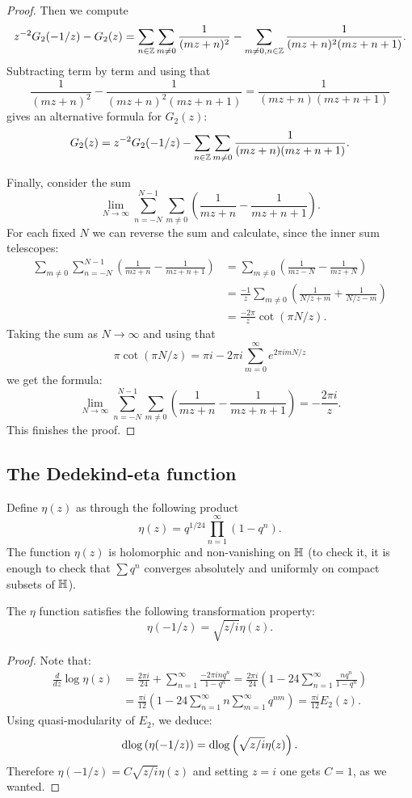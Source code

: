 \begin{proof}
Then we compute
\[
z^{-2}G_2(-1/z)-G_2(z) = \sum_{n\in\mathbb{Z}}\sum_{m\neq 0}\frac{1}{(mz+n)^2} - \sum_{m\neq 0,n\in\mathbb{Z}} \frac{1}{(mz+n)^2(mz+n+1)}.
\]
Subtracting term by term and using that
\[
\frac{1}{(mz+n)^2} - \frac{1}{(mz+n)^2(mz+n+1)} = \frac{1}{(mz+n)(mz+n+1)}
\]
gives an alternative formula for $G_2(z)$:
\[
G_2(z) = z^{-2}G_2(-1/z) - \sum_{n\in\mathbb{Z}}\sum_{m\neq 0} \frac{1}{(mz+n)(mz+n+1)}.
\]

Finally, consider the sum
\[
\lim_{N\to\infty} \sum_{n=-N}^{N-1}\sum_{m\neq 0}\left(\frac{1}{mz+n}-\frac{1}{mz+n+1}\right).
\]
For each fixed $N$ we can reverse the sum and calculate, since the inner sum telescopes:
\begin{align*}
\sum_{m\neq 0}\sum_{n=-N}^{N-1} \left(\frac{1}{mz+n}-\frac{1}{mz+n+1}\right) &= \sum_{m\neq 0} \left(\frac{1}{mz-N} - \frac{1}{mz+N}\right)\\
&=\frac{-1}{z}\sum_{m\neq 0}\left( \frac{1}{N/z + m}+\frac{1}{N/z-m}\right)\\
&=\frac{-2\pi}{z}\cot(\pi N/z).
\end{align*}
Taking the sum as $N\to \infty$ and using that
\[
\pi\cot(\pi N/z)=\pi i-2\pi i\sum_{m=0}^\infty e^{2\pi i mN/z}
\]
we get the formula:
\[
\lim_{N\to\infty} \sum_{n=-N}^{N-1}\sum_{m\neq 0}\left(\frac{1}{mz+n}-\frac{1}{mz+n+1}\right)=-\frac{2\pi i}{z}.
\]
This finishes the proof.
\end{proof}

\subsection{The Dedekind-eta function}
\label{sec:dedekind-eta}

Define $\eta(z)$ as through the following product
\[
\eta(z) = q^{1/24}\prod_{n=1}^\infty (1-q^n).
\]
The function $\eta(z)$ is holomorphic and non-vanishing on $\mathbb{H}$ (to check it, it is enough to check that $\sum q^n$ converges absolutely and uniformly on compact subsets of $\mathbb{H}$).
\begin{theorem}
The $\eta$ function satisfies the following transformation property:
  \[
\eta(-1/z) = \sqrt{z/i} \eta(z).
\]
\end{theorem}
\begin{proof}
  Note that:
\begin{align*}
\frac d{dz} \log\eta(z) &= \frac{2\pi i}{24}  + \sum_{n=1}^\infty\frac{-2\pi i n q^n}{1-q^n} =\frac{2\pi i}{24}\left(1-24\sum_{n=1}^\infty \frac{nq^n}{1-q^n}\right)\\
&=\frac{\pi i}{12}\left(1-24\sum_{n=1}^\infty n\sum_{m=1}^\infty q^{nm}\right)=\frac{\pi i}{12} E_2(z).
\end{align*}
Using quasi-modularity of $E_2$, we deduce:
\[
\operatorname{dlog} \left(\eta(-1/z)\right) = \operatorname{dlog} \left(\sqrt{z/i} \eta(z)\right).
\]
Therefore $\eta(-1/z) = C \sqrt{z/i} \eta(z)$ and setting $z=i$ one gets $C=1$, as we wanted.
\end{proof}


